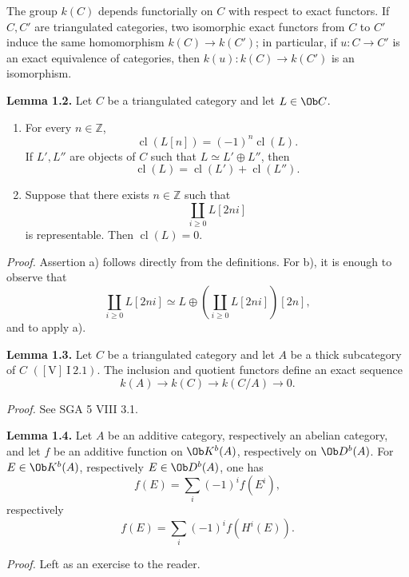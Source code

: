 \documentclass[11pt]{article}
\newcommand{\cl}{\operatorname{cl}}
\begin{document}
The group \(k(C)\) depends functorially on \(C\) with respect to exact functors. If \(C,C'\) are triangulated categories, two isomorphic exact functors from \(C\) to \(C'\) induce the same homomorphism \(k(C)\to k(C')\); in particular, if \(u:C\to C'\) is an exact equivalence of categories, then \(k(u):k(C)\to k(C')\) is an isomorphism.

\textbf{Lemma 1.2.} Let \(C\) be a triangulated category and let \(L\in\Ob C\).
\begin{enumerate}[label=\alph*)]
\item For every \(n\in\mathbb Z\),
\[
 \cl(L[n])=(-1)^n\cl(L).
\]
If \(L',L''\) are objects of \(C\) such that \(L\simeq L'\oplus L''\), then
\[
 \cl(L)=\cl(L')+\cl(L'').
\]
\item Suppose that there exists \(n\in\mathbb Z\) such that
\[
 \coprod_{i\geq0} L[2ni]
\]
is representable. Then \(\cl(L)=0\).
\end{enumerate}

\emph{Proof.} Assertion a) follows directly from the definitions. For b), it is enough to observe that
\[
 \coprod_{i\geq0} L[2ni]\simeq
 L\oplus\left(\coprod_{i\geq0}L[2ni]\right)[2n],
\]
and to apply a).

\textbf{Lemma 1.3.} Let \(C\) be a triangulated category and let \(A\) be a thick subcategory of \(C\) \(([\mathrm V]\ \mathrm{I}\ 2.1)\). The inclusion and quotient functors define an exact sequence
\[
 k(A)\longrightarrow k(C)\longrightarrow k(C/A)\longrightarrow 0.
\]

\emph{Proof.} See SGA 5 VIII 3.1.

\textbf{Lemma 1.4.} Let \(A\) be an additive category, respectively an abelian category, and let \(f\) be an additive function on \(\Ob K^b(A)\), respectively on \(\Ob D^b(A)\). For \(E\in\Ob K^b(A)\), respectively \(E\in\Ob D^b(A)\), one has
\[
 f(E)=\sum_i(-1)^i f(E^i),
\]
respectively
\[
 f(E)=\sum_i(-1)^i f(H^i(E)).
\]

\emph{Proof.} Left as an exercise to the reader.
\end{document}
